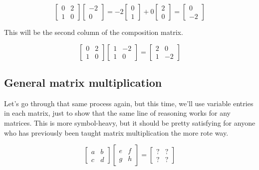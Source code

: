 \begin{equation*}
  \begin{bmatrix}
    0 & 2 \\
    1 & 0
  \end{bmatrix}
  \begin{bmatrix}
    -2 \\
    0
  \end{bmatrix} = -2
  \begin{bmatrix}
    0 \\
    1
  \end{bmatrix} + 0
  \begin{bmatrix}
    2 \\
    0
  \end{bmatrix} =
  \begin{bmatrix}
    0 \\
    -2
  \end{bmatrix}
\end{equation*}

This will be the second column of the composition matrix.

\begin{equation*}
  \begin{bmatrix}
    0 & 2 \\
    1 & 0
  \end{bmatrix}
  \begin{bmatrix}
    1 & -2 \\
    1 & 0
  \end{bmatrix} =
  \begin{bmatrix}
    2 & 0 \\
    1 & -2
  \end{bmatrix}
\end{equation*}

\subsection{General matrix multiplication}

Let's go through that same process again, but this time, we'll use variable
entries in each matrix, just to show that the same line of reasoning works for
any matrices. This is more symbol-heavy, but it should be pretty satisfying for
anyone who has previously been taught matrix multiplication the more rote way.

\begin{equation*}
  \begin{bmatrix}
    a & b \\
    c & d
  \end{bmatrix}
  \begin{bmatrix}
    e & f \\
    g & h
  \end{bmatrix} =
  \begin{bmatrix}
    ? & ? \\
    ? & ?
  \end{bmatrix}
\end{equation*}

